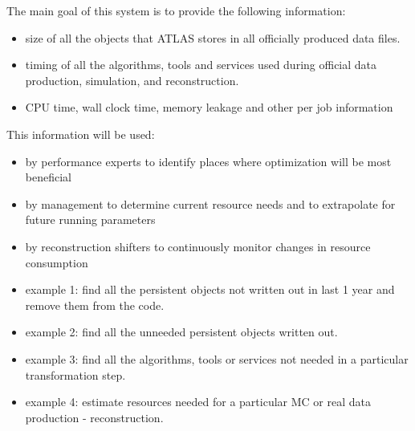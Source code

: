 \documentclass[a4paper]{jpconf}
\begin{document}
The main goal of this system is to provide the following information:
\begin{itemize}
	\item size of all the objects that ATLAS stores in all officially produced data files.
	\item timing of all the algorithms, tools and services used during official data production, simulation, and reconstruction.
	\item CPU time, wall clock time, memory leakage and other per job information 
\end{itemize}



This information will be used:
\begin{itemize}
	\item by performance experts to identify places where optimization will be most beneficial
	\item by management to determine current resource needs and to extrapolate for future running parameters
	\item by reconstruction shifters to continuously monitor changes in resource consumption
	\item example 1: find all the persistent objects not written out in last 1 year and remove them from the code.
	\item example 2: find all the unneeded persistent objects written out.
	\item example 3: find all the algorithms, tools or services not needed in a particular transformation step.
	\item example 4: estimate resources needed for a particular MC or real data production - reconstruction. 
\end{itemize}
\end{document}
